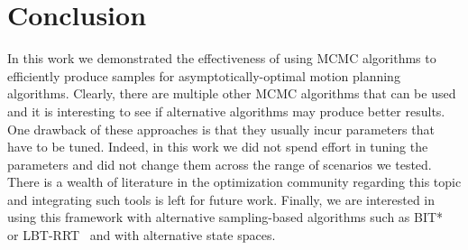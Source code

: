 \documentclass[letterpaper, 10 pt, conference]{ieeeconf}  %
\begin{document}
\section{Conclusion}
\label{sec:future}

In this work we demonstrated the effectiveness of using MCMC algorithms to 
efficiently produce samples for asymptotically-optimal motion planning algorithms.
Clearly, there are multiple other MCMC algorithms that can be used and it is interesting to see if alternative algorithms may produce better results.
One drawback of these approaches is that they usually incur parameters that have to be tuned. Indeed, in this work we did not spend effort in tuning the parameters and did not change them across the range of scenarios we tested. 
There is a wealth of literature in the optimization community regarding this topic and integrating  such tools is left for future work.
Finally, we are interested in using this framework with alternative sampling-based algorithms such as BIT*~\cite{GSB15} or LBT-RRT~\cite{SH16} and with alternative state spaces.





%
\end{document}

